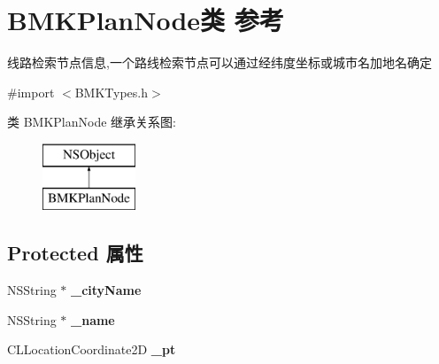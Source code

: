 \hypertarget{interface_b_m_k_plan_node}{\section{B\+M\+K\+Plan\+Node类 参考}
\label{interface_b_m_k_plan_node}
}


线路检索节点信息,一个路线检索节点可以通过经纬度坐标或城市名加地名确定  




{\ttfamily \#import $<$B\+M\+K\+Types.\+h$>$}

类 B\+M\+K\+Plan\+Node 继承关系图\+:\begin{figure}[H]
\begin{center}
\leavevmode
\includegraphics[height=2.000000cm]{interface_b_m_k_plan_node}
\end{center}
\end{figure}
\subsection*{Protected 属性}
\begin{DoxyCompactItemize}
\item 
\hypertarget{interface_b_m_k_plan_node_a1536db105328adee8a9e0c44804d8755}{N\+S\+String $\ast$ {\bfseries \+\_\+city\+Name}}\label{interface_b_m_k_plan_node_a1536db105328adee8a9e0c44804d8755}

\item 
\hypertarget{interface_b_m_k_plan_node_a6eeeeb61aa4389cea7e8ebb1d03a4d61}{N\+S\+String $\ast$ {\bfseries \+\_\+name}}\label{interface_b_m_k_plan_node_a6eeeeb61aa4389cea7e8ebb1d03a4d61}

\item 
\hypertarget{interface_b_m_k_plan_node_a503dbc9a4e2e07e81c3a701b64fcd3c3}{C\+L\+Location\+Coordinate2\+D {\bfseries \+\_\+pt}}\label{interface_b_m_k_plan_node_a503dbc9a4e2e07e81c3a701b64fcd3c3}

\end{DoxyCompactItemize}
